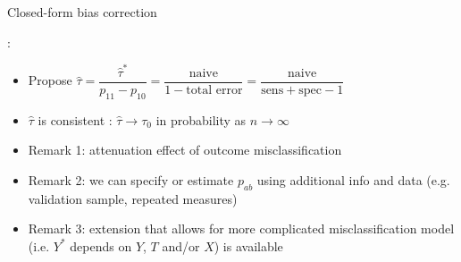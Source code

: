 \documentclass[12pt,aspectratio=169]{beamer}
\begin{document}
\begin{frame}{Closed-form bias correction}

\begin{block}
:
{\it

\begin{itemize}


\item  {\color{cred}Propose}  $\hat\tau=\dfrac{\hat\tau^\ast}{p_{11}-p_{10}}=\dfrac{\text{naive}}{1-\text{total error}}=\dfrac{\text{naive}}{\text{sens}+\text{spec}-1}$

\item
$\hat\tau$ is {\color{cred}consistent} :  {\color{cred}$\hat\tau\rightarrow  \tau_0$} in probability as $n\rightarrow  \infty$

\end{itemize}
}
\end{block}

\bigskip

\begin{itemize}

\item Remark 1: \colorbox{blue!10}{attenuation effect} of outcome misclassification

\pause

\item Remark 2: we can specify or estimate $p_{ab}$ using additional info and data (e.g. validation sample, repeated measures)

\item Remark 3: extension that allows for more complicated misclassification model (i.e. $Y^\ast$ depends on $Y$, $T$ and/or $X$) is available


\end{itemize}
\end{frame}
\end{document}

